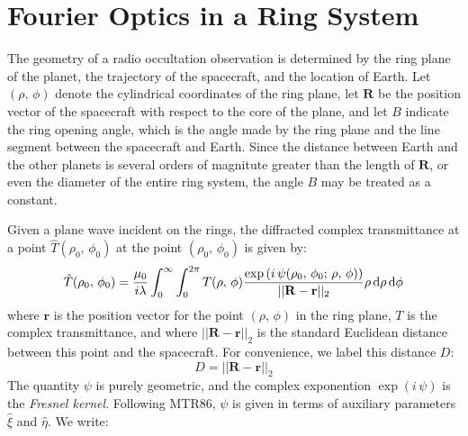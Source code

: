 \documentclass{article}
\begin{document}
    \section{Fourier Optics in a Ring System}
        The geometry of a radio occultation observation is determined by the
        ring plane of the planet, the trajectory of the spacecraft, and the
        location of Earth. Let $(\rho,\,\phi)$ denote the cylindrical
        coordinates of the ring plane, let $\mathbf{R}$ be the position
        vector of the spacecraft with respect to the core of the plane, and
        let $B$ indicate the ring opening angle, which is the angle made
        by the ring plane and the line segment between the spacecraft and
        Earth. Since the distance between Earth and the other planets is
        several orders of magnitute greater than the length of $\mathbf{R}$,
        or even the diameter of the entire ring system, the angle $B$ may be
        treated as a constant.
        \par\hfill\par
        Given a plane wave incident on the rings, the diffracted complex
        transmittance at a point $\hat{T}(\rho_{0},\,\phi_{0})$ at the point
        $(\rho_{0},\,\phi_{0})$ is given by:
        \begin{equation}
            \label{eqn:huygens_principal}
            \hat{T}(\rho_{0},\,\phi_{0})
            =\frac{\mu_{0}}{i\lambda}\int_{0}^{\infty}\int_{0}^{2\pi}
                T(\rho,\,\phi)
                \frac{%
                    \exp\left(
                        i\,\psi(\rho_{0},\,\phi_{0};\,\rho,\,\phi)
                    \right)
                }{%
                    ||\mathbf{R}-\mathbf{r}||_{2}
                }
                \rho\,\textrm{d}\rho\,\textrm{d}\phi
        \end{equation}
        where $\mathbf{r}$ is the position vector for the point
        $(\rho,\,\phi)$ in the ring plane, $T$ is the complex transmittance,
        and where $||\mathbf{R}-\mathbf{r}||_{2}$ is the standard
        Euclidean distance between this point and the spacecraft.
        For convenience, we label this distance $D$:
        \begin{equation}
            D=||\mathbf{R}-\mathbf{r}||_{2}
        \end{equation}
        The quantity $\psi$ is purely geometric, and the complex
        exponention $\exp(i\,\psi)$ is the \textit{Fresnel kernel}.
        Following MTR86, $\psi$ is given in terms of auxiliary parameters
        $\hat{\xi}$ and $\hat{\eta}$. We write:
\end{document}
